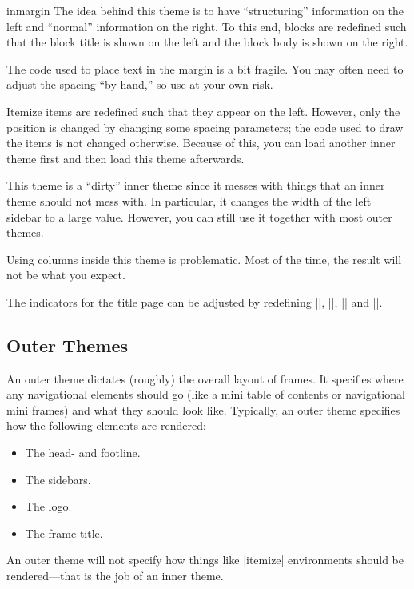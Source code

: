\begin{innerthemeexample}{inmargin}
  The idea behind this theme is to have ``structuring'' information on the left and ``normal'' information on the right. To this end, blocks are redefined such that the block title is shown on the left and the block body is shown on the right.

  The code used to place text in the margin is a bit fragile. You may often need to adjust the spacing ``by hand,'' so use at your own risk.

  Itemize items are redefined such that they appear on the left. However, only the position is changed by changing some spacing parameters; the code used to draw the items is not changed otherwise. Because of this, you can load another inner theme first and then load this theme afterwards.

  This theme is a ``dirty'' inner theme since it messes with things that an inner theme should not mess with. In particular, it changes the width of the left sidebar to a large value. However, you can still use it together with most outer themes.

  Using columns inside this theme is problematic. Most of the time, the result will not be what you expect.
  
  The indicators for the title page can be adjusted by redefining |\inserttitleindicator|, |\insertauthorindicator|, |\insertinstituteindicator| and |\insertdateindicator|.  
\end{innerthemeexample}


\subsection{Outer Themes}

An outer theme dictates (roughly) the overall layout of frames. It specifies where any navigational elements should go (like a mini table of contents or navigational mini frames) and what they should look like. Typically, an outer theme specifies how the following elements are rendered:
\begin{itemize}
\item The head- and footline.
\item The sidebars.
\item The logo.
\item The frame title.
\end{itemize}

An outer theme will not specify how things like |itemize| environments should be rendered---that is the job of an inner theme.

